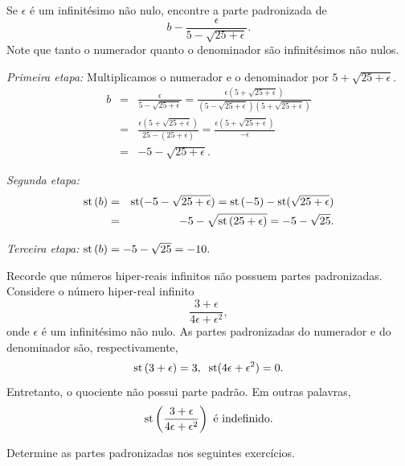 \begin{example}
Se $\epsilon$ é um infinitésimo não nulo, encontre a parte padronizada de
$$
  b - \frac{\epsilon}{5 - \sqrt{25 + \epsilon}}.
$$
Note que tanto o numerador quanto o denominador são infinitésimos não
nulos.

\emph{Primeira etapa:} Multiplicamos o numerador e o denominador por
$5 + \sqrt{25 + \epsilon}$.
\begin{eqnarray*}
  b & = & \frac{\epsilon}{5 - \sqrt{25 + \epsilon}} =
          \frac{\epsilon(5 + \sqrt{25 + \epsilon})}%
               {(5-\sqrt{25+\epsilon})(5+\sqrt{25+\epsilon})} \\
    & = & \frac{\epsilon(5 + \sqrt{25 + \epsilon})}%
               {25 - (25 + \epsilon)} =
          \frac{\epsilon(5 + \sqrt{25 + \epsilon})}{-\epsilon} \\
    & = & -5 - \sqrt{25 + \epsilon}.
\end{eqnarray*}

\emph{Segunda etapa:}
\begin{eqnarray*}
  \operatorname{st}\left(b\right) & = & \operatorname{st}(-5 - \sqrt{25 + \epsilon}) = 
               \operatorname{st}\left(-5\right) -\operatorname{st}(\sqrt{25 + \epsilon}) \\
         & = & -5 - \sqrt{\operatorname{st}\left(25 + \epsilon\right)} = -5 - \sqrt{25}.
\end{eqnarray*}

\emph{Terceira etapa:} $\operatorname{st}\left(b\right) = -5 - \sqrt{25} = -10.$
\end{example}

\begin{example}
Recorde que números hiper-reais infinitos não possuem partes padronizadas.
Considere o número hiper-real infinito
$$
  \frac{3 + \epsilon}{4\epsilon + \epsilon^2},
$$
onde $\epsilon$ é um infinitésimo não nulo. As partes padronizadas do
numerador e do denominador são, respectivamente,
$$
  \operatorname{st}\left(3+\epsilon\right) = 3, \; \; \operatorname{st}(4\epsilon + \epsilon^2) = 0.
$$
Entretanto, o quociente não possui parte padrão. Em outras palavras,
$$
  \operatorname{st}\left(\frac{3 + \epsilon}{4\epsilon + \epsilon^2}\right) \text{ é indefinido.}
$$
\end{example}

\begin{sectionproblems}

Determine as partes padronizadas nos seguintes exercícios.


\end{sectionproblems}

\begin{chapterproblems}
\end{chapterproblems}

